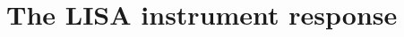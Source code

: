\documentclass[aps,showpacs,twocolumn,prd,superscriptaddress,nofootinbib]{revtex4-1}
\newcommand{\SM}[1]{{\color{Blue} #1}}
\begin{document}
\appendix


\section{The LISA instrument response}
\label{app:response}

%
%
%
%
%
%
\end{document}
